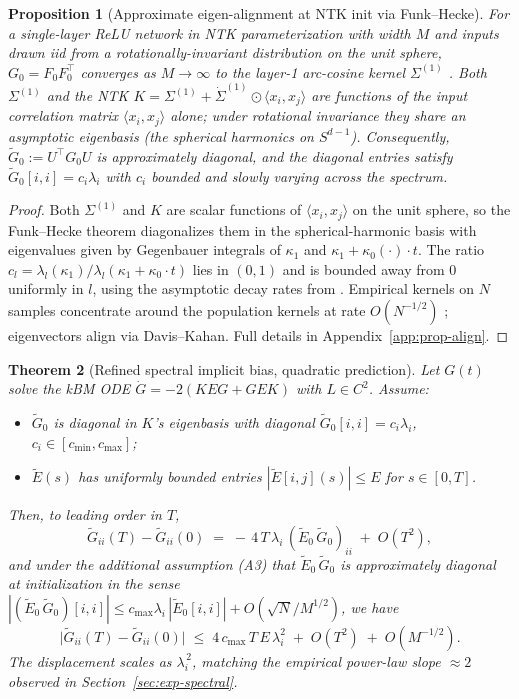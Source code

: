 \documentclass[11pt,letterpaper]{article}
\newtheorem{theorem}{Theorem}
\newtheorem{proposition}[theorem]{Proposition}
\newcommand{\E}{E}
\newcommand{\Gtilde}{\widetilde{G}}
\newcommand{\Etilde}{\widetilde{\E}}
\begin{document}
\begin{proposition}[Approximate eigen-alignment at NTK init via Funk--Hecke]
\label{prop:align}
For a single-layer ReLU network in NTK parameterization with width $M$ and
inputs drawn iid from a rotationally-invariant distribution on the unit
sphere, $G_0 = F_0 F_0^\top$ converges as $M \to \infty$ to the layer-1
arc-cosine kernel $\Sigma^{(1)}$ \citep{cho2009kernel}. Both
$\Sigma^{(1)}$ and the NTK $K = \Sigma^{(1)} + \dot{\Sigma}^{(1)} \odot
\langle x_i, x_j\rangle$ are functions of the input correlation matrix
$\langle x_i, x_j\rangle$ alone; under rotational invariance they share an
asymptotic eigenbasis (the spherical harmonics on $S^{d-1}$). Consequently,
$\Gtilde_0 := U^\top G_0 U$ is approximately diagonal, and the
diagonal entries satisfy $\Gtilde_0[i,i] = c_i \lambda_i$ with $c_i$
bounded and slowly varying across the spectrum.
\end{proposition}

\begin{proof}
Both $\Sigma^{(1)}$ and $K$ are scalar functions of $\langle x_i, x_j\rangle$
on the unit sphere, so the Funk--Hecke theorem
\citep[Theorem~2.22]{atkinson2012spherical} diagonalizes them in the
spherical-harmonic basis with eigenvalues given by Gegenbauer integrals
of $\kappa_1$ and $\kappa_1 + \kappa_0(\cdot)\cdot t$. The ratio
$c_l = \lambda_l(\kappa_1) / \lambda_l(\kappa_1 + \kappa_0\cdot t)$ lies
in $(0, 1)$ and is bounded away from $0$ uniformly in $l$, using the
asymptotic decay rates from \citet{bach2017breaking}. Empirical kernels
on $N$ samples concentrate around the population kernels at rate
$O(N^{-1/2})$ \citep{tropp2015introduction}; eigenvectors align via
Davis--Kahan. Full details in Appendix~\ref{app:prop-align}.
\end{proof}

\begin{theorem}[Refined spectral implicit bias, quadratic prediction]
\label{thm:spectral-refined}
Let $G(t)$ solve the kBM ODE $\dot{G} = -2(K\E G + G\E K)$ with $L \in C^2$.
Assume:
\begin{itemize}
\item[(A1)] $\Gtilde_0$ is diagonal in $K$'s eigenbasis with diagonal
$\Gtilde_0[i,i] = c_i \lambda_i$, $c_i \in [c_{\min}, c_{\max}]$;
\item[(A2)] $\Etilde(s)$ has uniformly bounded entries
$|\Etilde[i,j](s)| \leq E$ for $s \in [0, T]$.
\end{itemize}
Then, to leading order in $T$,
\[
\Gtilde_{ii}(T) - \Gtilde_{ii}(0)
\;=\; -\,4\,T\,\lambda_i\,(\Etilde_0\,\Gtilde_0)_{ii} \;+\; O(T^2),
\]
and under the additional assumption (A3) that $\Etilde_0\,\Gtilde_0$ is
approximately diagonal at initialization in the sense
$|(\Etilde_0\,\Gtilde_0)[i,i]| \leq c_{\max}\lambda_i\,|\Etilde_0[i,i]|
+ O(\sqrt{N}/M^{1/2})$, we have
\[
\boxed{\;
\bigl|\Gtilde_{ii}(T) - \Gtilde_{ii}(0)\bigr|
\;\leq\; 4\,c_{\max}\,T\,E\,\lambda_i^{2} \;+\; O(T^2) \;+\; O(M^{-1/2}).
\;}
\]
The displacement scales as $\lambda_i^{\,2}$, matching the empirical
power-law slope $\approx 2$ observed in
Section~\ref{sec:exp-spectral}.
\end{theorem}
\end{document}

